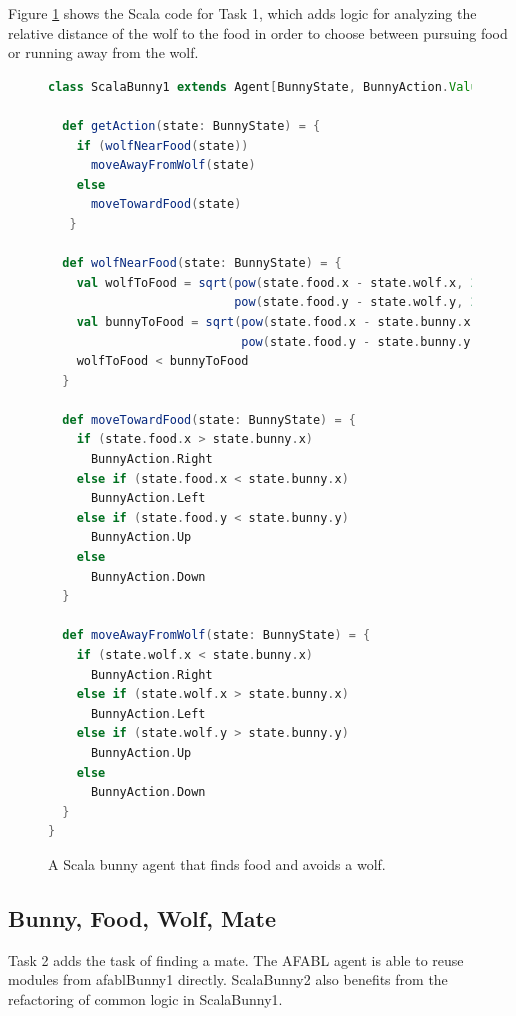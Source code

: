 Figure  \ref{fig:scala1} shows the Scala code for Task 1, which adds logic for analyzing the relative distance of the wolf to the food in order to choose between pursuing food or running away from the wolf.

\begin{figure}[h]
\begin{lstlisting}[language=Scala]
class ScalaBunny1 extends Agent[BunnyState, BunnyAction.Value] {

  def getAction(state: BunnyState) = {
    if (wolfNearFood(state))
      moveAwayFromWolf(state)
    else
      moveTowardFood(state)
   }

  def wolfNearFood(state: BunnyState) = {
    val wolfToFood = sqrt(pow(state.food.x - state.wolf.x, 2) +
                          pow(state.food.y - state.wolf.y, 2))
    val bunnyToFood = sqrt(pow(state.food.x - state.bunny.x, 2) +
                           pow(state.food.y - state.bunny.y, 2))
    wolfToFood < bunnyToFood
  }

  def moveTowardFood(state: BunnyState) = {
    if (state.food.x > state.bunny.x)
      BunnyAction.Right
    else if (state.food.x < state.bunny.x)
      BunnyAction.Left
    else if (state.food.y < state.bunny.y)
      BunnyAction.Up
    else
      BunnyAction.Down
  }

  def moveAwayFromWolf(state: BunnyState) = {
    if (state.wolf.x < state.bunny.x)
      BunnyAction.Right
    else if (state.wolf.x > state.bunny.x)
      BunnyAction.Left
    else if (state.wolf.y > state.bunny.y)
      BunnyAction.Up
    else
      BunnyAction.Down
  }
}
\end{lstlisting}
\caption{A Scala bunny agent that finds food and avoids a wolf.}
\label{fig:scala1}
\end{figure}

\subsection{Bunny, Food, Wolf, Mate}

Task 2 adds the task of finding a mate. The AFABL agent is able to reuse modules from afablBunny1 directly. ScalaBunny2 also benefits from the refactoring of common logic in ScalaBunny1.

